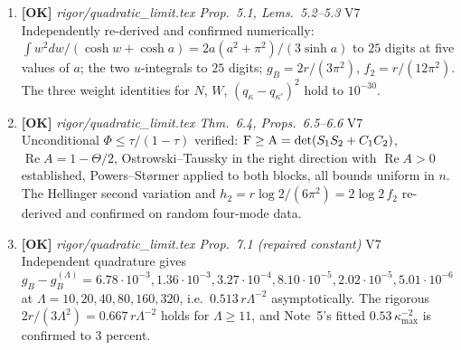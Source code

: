 \documentclass[11pt]{article}
\begin{document}
\begin{enumerate}[leftmargin=1.6em,itemsep=6pt]
\item \textbf{[OK]} \emph{rigor/quadratic\_limit.tex Prop.~5.1, Lems.~5.2--5.3} \hfill\textsc{V7}\\ Independently re-derived and confirmed numerically: \(\int w^2dw/(\cosh w+\cosh a)=2a(a^2+\pi^2)/(3\sinh a)\) to \(25\) digits at five values of \(a\); the two \(u\)-integrals to \(25\) digits; \(g_B=2r/(3\pi^2)\), \(f_2=r/(12\pi^2)\). The three weight identities for \(N\), \(W\), \((q_\kappa-q_{\kappa'})^2\) hold to \(10^{-30}\).
\item \textbf{[OK]} \emph{rigor/quadratic\_limit.tex Thm.~6.4, Props.~6.5--6.6} \hfill\textsc{V7}\\ Unconditional \(\Phi\le\tau/(1-\tau)\) verified: \(\operatorname{F}\ge\operatorname{A}=\det(S_1S_2+C_1C_2)\), \(\operatorname{Re}A=1-\Theta/2\), Ostrowski--Taussky in the right direction with \(\operatorname{Re}A>0\) established, Powers--St\o rmer applied to both blocks, all bounds uniform in \(n\). The Hellinger second variation and \(h_2=r\log2/(6\pi^2)=2\log2\,f_2\) re-derived and confirmed on random four-mode data.
\item \textbf{[OK]} \emph{rigor/quadratic\_limit.tex Prop.~7.1 (repaired constant)} \hfill\textsc{V7}\\ Independent quadrature gives \(g_B-g_B^{(\Lambda)}=6.78\cdot10^{-3},1.36\cdot10^{-3},3.27\cdot10^{-4},8.10\cdot10^{-5},2.02\cdot10^{-5},5.01\cdot10^{-6}\) at \(\Lambda=10,20,40,80,160,320\), i.e.\ \(0.513\,r\Lambda^{-2}\) asymptotically. The rigorous \(2r/(3\Lambda^2)=0.667\,r\Lambda^{-2}\) holds for \(\Lambda\ge11\), and Note~5's fitted \(0.53\,\kappa_{\max}^{-2}\) is confirmed to \(3\) percent.

\end{enumerate}
\end{document}
